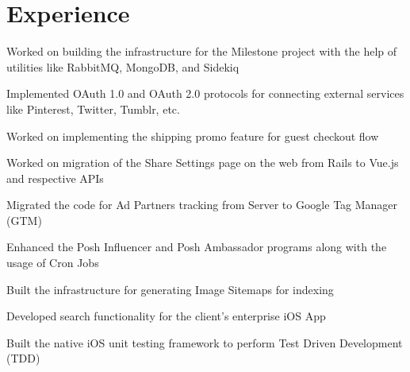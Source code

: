 \documentclass[letterpaper]{deedy-resume} %
\begin{document}
\begin{minipage}[t]{0.66\textwidth} %


\section{Experience}


\vspace{\topsep} %
\begin{tightitemize}
\item Worked on building the infrastructure for the Milestone project with the help of utilities like RabbitMQ, MongoDB, and Sidekiq
\end{tightitemize}

\begin{tightitemize}
\item Implemented OAuth 1.0 and OAuth 2.0 protocols for connecting external services like Pinterest, Twitter, Tumblr, etc.
\item Worked on implementing the shipping promo feature for guest checkout flow
\item Worked on migration of the Share Settings page on the web from Rails to Vue.js and respective APIs
\end{tightitemize}

\begin{tightitemize}
\item Migrated the code for Ad Partners tracking from Server to Google Tag Manager (GTM)
\item Enhanced the Posh Influencer and Posh Ambassador programs along with the usage of Cron Jobs
\item Built the infrastructure for generating Image Sitemaps for indexing
\end{tightitemize}


\begin{tightitemize}
\item Developed search functionality for the client's enterprise iOS App
\item Built the native iOS unit testing framework to perform Test Driven Development (TDD)
\end{tightitemize}


\end{minipage}
\end{document}
